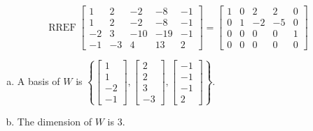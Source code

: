 \begin{exerciseAnswer} 


\[\operatorname{RREF} \left[\begin{array}{ccccc}
1 & 2 & -2 & -8 & -1 \\
1 & 2 & -2 & -8 & -1 \\
-2 & 3 & -10 & -19 & -1 \\
-1 & -3 & 4 & 13 & 2
\end{array}\right] = \left[\begin{array}{ccccc}
1 & 0 & 2 & 2 & 0 \\
0 & 1 & -2 & -5 & 0 \\
0 & 0 & 0 & 0 & 1 \\
0 & 0 & 0 & 0 & 0
\end{array}\right] \]


\begin{enumerate}[(a)]
\item A basis of \(W\) is \( \left\{ \left[\begin{array}{c}
1 \\
1 \\
-2 \\
-1
\end{array}\right] , \left[\begin{array}{c}
2 \\
2 \\
3 \\
-3
\end{array}\right] , \left[\begin{array}{c}
-1 \\
-1 \\
-1 \\
2
\end{array}\right] \right\} \).
\item The dimension of \(W\) is \( 3 \).
\end{enumerate}
    
\end{exerciseAnswer}
    
